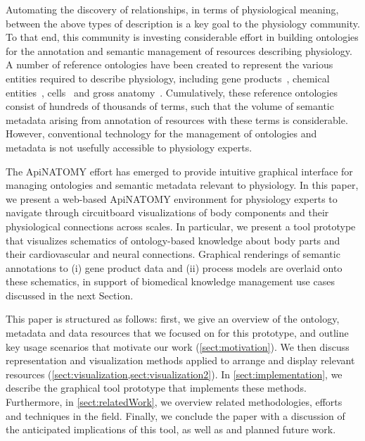 Automating the discovery of relationships, in terms of physiological meaning, between the above types of description is a key goal to the physiology community. To that end, this community is investing considerable effort in building ontologies for the annotation and semantic management of resources describing physiology. A number of reference ontologies have been created to represent the various entities required to describe physiology, including gene products~\cite{Bla+13}, chemical entities~\cite{HMD+13}, cells~\cite{BRA05} and gross anatomy~\cite{RM03}. Cumulatively, these reference ontologies consist of hundreds of thousands of terms, such that the volume of semantic metadata arising from annotation of resources with these terms is considerable. However, conventional technology for the management of ontologies and metadata is not usefully accessible to physiology experts.

The ApiNATOMY effort has emerged to provide intuitive graphical interface for managing ontologies and semantic metadata relevant to physiology. In this paper, we present a web-based ApiNATOMY environment for physiology experts to navigate through circuitboard visualizations of body components and their physiological connections across scales. In particular, we present a tool prototype that visualizes schematics of ontology-based knowledge about body parts and their cardiovascular and neural connections. Graphical renderings of semantic annotations to (i) gene product data and (ii) process models are overlaid onto these schematics, in support of biomedical knowledge management use cases discussed in the next Section.

This paper is structured as follows: first, we give an overview of the ontology, metadata and data resources that we focused on for this prototype, and outline key usage scenarios that motivate our work (\cref{sect:motivation}).  We then discuss representation and visualization methods applied to arrange and display relevant resources (\cref{sect:visualization,sect:visualization2}). In \cref{sect:implementation}, we describe the graphical tool prototype that implements these methods. Furthermore, in \cref{sect:relatedWork}, we overview related methodologies, efforts and techniques in the field. Finally, we conclude the paper with a discussion of the anticipated implications of this tool, as well as and planned future work.
